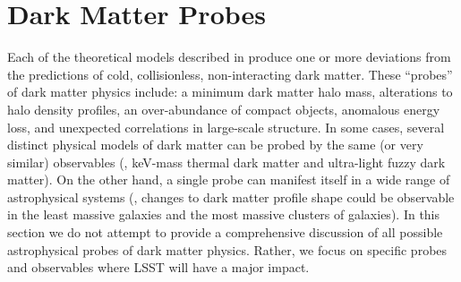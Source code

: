 \chapter{Dark Matter Probes}
\label{sec:probes}
\bigskip
{}

Each of the theoretical models described in  produce one or more deviations from the predictions of cold, collisionless, non-interacting dark matter.
These ``probes'' of dark matter physics include: a minimum dark matter halo mass, alterations to halo density profiles, an over-abundance of compact objects, anomalous energy loss, and unexpected correlations in large-scale structure.
In some cases, several distinct physical models of dark matter can be probed by the same (or very similar) observables (\eg, keV-mass thermal dark matter and ultra-light fuzzy dark matter). 
On the other hand, a single probe can manifest itself in a wide range of astrophysical systems (\eg, changes to dark matter profile shape could be observable in the least massive galaxies and the most massive clusters of galaxies).
In this section we do not attempt to provide a comprehensive discussion of all possible astrophysical probes of dark matter physics.
Rather, we focus on specific probes and observables where LSST will have a major impact.






